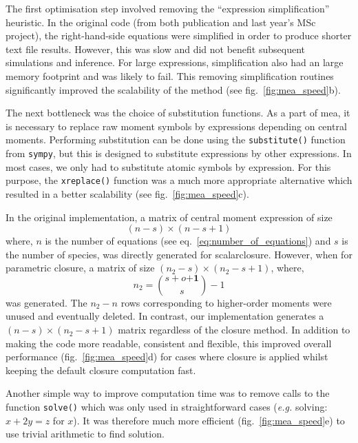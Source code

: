 \documentclass[11pt,a4paper]{article}
\newcommand{\sympy}{\texttt{sympy}}
\newcommand{\eg}{\emph{e.g.}}
\begin{document}
The first optimisation step involved removing the ``expression simplification'' heuristic.
In the original code (from both publication\cite{ale_general_2013} and last year's MSc project\cite{babtie_moment_2013}), 
the right-hand-side equations were simplified in order to produce shorter text file results.
However, this was slow and did not benefit subsequent simulations and inference.
For large expressions, simplification also had an large memory footprint and was likely to fail.
This removing simplification routines significantly improved the scalability of the method (see fig.~\ref{fig:mea_speed}b).

The next bottleneck was the choice of substitution functions.
As a part of \gls{mea}, it is necessary to replace raw moment symbols by expressions depending on central moments.
Performing substitution can be done using the \texttt{substitute()} function from \sympy, but this is designed to substitute expressions by other expressions.
In most cases, we only had to substitute atomic symbols by expression.
For this purpose, the \texttt{xreplace()} function was a much more appropriate alternative which resulted in a better scalability (see fig.~\ref{fig:mea_speed}c).

In the original implementation, a matrix of central moment expression of size
\[(n-s) \times (n-s + 1)\]
where,
$n$ is the number of equations (see eq.~\ref{eq:number_of_equations}) and
$s$ is the number of species,
was directly generated for scalarclosure.
However, when for parametric closure, a matrix of size $(n_2-s) \times (n_2-s + 1)$,
where,
\[n_2={{s+o \mathbf{+1}} \choose {s}} -1\]
was generated.
The $n_2 - n$ rows corresponding to higher-order moments were unused and eventually deleted.
In contrast, our implementation generates a $(n-s) \times (n_2-s + 1)$ matrix regardless of the closure method.
In addition to making the code more readable, consistent and flexible, this improved overall performance (fig.~\ref{fig:mea_speed}d) 
for cases where closure is applied whilst keeping the default closure computation fast.

Another simple way to improve computation time was to remove calls to the function \texttt{solve()} which was only used in straightforward cases
(\eg{} solving: $x + 2y = z$ for $x$).
It was therefore much more efficient (fig.~\ref{fig:mea_speed}e) to use trivial arithmetic to find solution.
\end{document}
